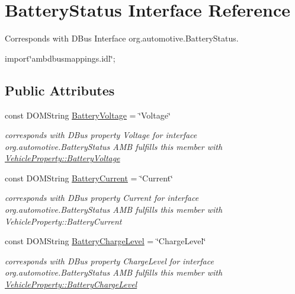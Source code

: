 \hypertarget{interfaceBatteryStatus}{\section{Battery\+Status Interface Reference}
\label{interfaceBatteryStatus}
}


Corresponds with D\+Bus Interface org.\+automotive.\+Battery\+Status.  




{\ttfamily import\char`\"{}ambdbusmappings.\+idl\char`\"{};}

\subsection*{Public Attributes}
\begin{DoxyCompactItemize}
\item 
\hypertarget{interfaceBatteryStatus_afb14133e6ba7b0e975c9d8202240eafd}{const D\+O\+M\+String \hyperlink{interfaceBatteryStatus_afb14133e6ba7b0e975c9d8202240eafd}{Battery\+Voltage} = \char`\"{}Voltage\char`\"{}}\label{interfaceBatteryStatus_afb14133e6ba7b0e975c9d8202240eafd}

\begin{DoxyCompactList}\small\item\em corresponds with D\+Bus property Voltage for interface org.\+automotive.\+Battery\+Status A\+M\+B fulfills this member with \hyperlink{classVehicleProperty_a43a70a277b955ae35a9ba795d2052591}{Vehicle\+Property\+::\+Battery\+Voltage} \end{DoxyCompactList}\item 
\hypertarget{interfaceBatteryStatus_ac0cd6fdef88ab9c883bd7102d3d56b67}{const D\+O\+M\+String \hyperlink{interfaceBatteryStatus_ac0cd6fdef88ab9c883bd7102d3d56b67}{Battery\+Current} = \char`\"{}Current\char`\"{}}\label{interfaceBatteryStatus_ac0cd6fdef88ab9c883bd7102d3d56b67}

\begin{DoxyCompactList}\small\item\em corresponds with D\+Bus property Current for interface org.\+automotive.\+Battery\+Status A\+M\+B fulfills this member with Vehicle\+Property\+::\+Battery\+Current \end{DoxyCompactList}\item 
\hypertarget{interfaceBatteryStatus_a82efd679635044f40e77f32b682caf9d}{const D\+O\+M\+String \hyperlink{interfaceBatteryStatus_a82efd679635044f40e77f32b682caf9d}{Battery\+Charge\+Level} = \char`\"{}Charge\+Level\char`\"{}}\label{interfaceBatteryStatus_a82efd679635044f40e77f32b682caf9d}

\begin{DoxyCompactList}\small\item\em corresponds with D\+Bus property Charge\+Level for interface org.\+automotive.\+Battery\+Status A\+M\+B fulfills this member with \hyperlink{classVehicleProperty_a71025201c20a84f3303b32b08872113a}{Vehicle\+Property\+::\+Battery\+Charge\+Level} \end{DoxyCompactList}\end{DoxyCompactItemize}


